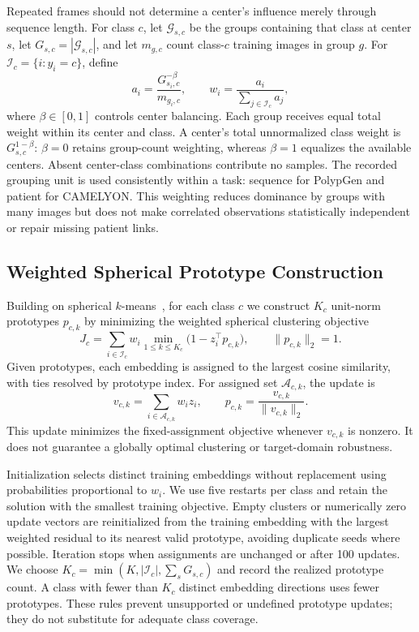 Repeated frames should not determine a center's influence merely through sequence length. For class $c$, let $\mathcal{G}_{s,c}$ be the groups containing that class at center $s$, let $G_{s,c}=|\mathcal{G}_{s,c}|$, and let $m_{g,c}$ count class-$c$ training images in group $g$. For $\mathcal{I}_c=\{i:y_i=c\}$, define
\begin{equation}
    a_i=\frac{G_{s_i,c}^{-\beta}}{m_{g_i,c}},
    \qquad
    w_i=\frac{a_i}{\sum_{j\in\mathcal{I}_c}a_j},
    \label{eq:cbmp_weights}
\end{equation}
where $\beta\in[0,1]$ controls center balancing. Each group receives equal total weight within its center and class. A center's total unnormalized class weight is $G_{s,c}^{1-\beta}$: $\beta=0$ retains group-count weighting, whereas $\beta=1$ equalizes the available centers. Absent center-class combinations contribute no samples. The recorded grouping unit is used consistently within a task: sequence for PolypGen and patient for CAMELYON. This weighting reduces dominance by groups with many images but does not make correlated observations statistically independent or repair missing patient links.

\subsection{Weighted Spherical Prototype Construction}
Building on spherical $k$-means~\cite{dhillon2001spherical}, for each class $c$ we construct $K_c$ unit-norm prototypes $p_{c,k}$ by minimizing the weighted spherical clustering objective
\begin{equation}
    J_c=\sum_{i\in\mathcal{I}_c}w_i
    \min_{1\leq k\leq K_c}\bigl(1-z_i^\top p_{c,k}\bigr),
    \qquad \|p_{c,k}\|_2=1.
    \label{eq:cbmp_clustering}
\end{equation}
Given prototypes, each embedding is assigned to the largest cosine similarity, with ties resolved by prototype index. For assigned set $\mathcal{A}_{c,k}$, the update is
\begin{equation}
    v_{c,k}=\sum_{i\in\mathcal{A}_{c,k}}w_i z_i,
    \qquad p_{c,k}=\frac{v_{c,k}}{\|v_{c,k}\|_2}.
    \label{eq:cbmp_update}
\end{equation}
This update minimizes the fixed-assignment objective whenever $v_{c,k}$ is nonzero. It does not guarantee a globally optimal clustering or target-domain robustness.

Initialization selects distinct training embeddings without replacement using probabilities proportional to $w_i$. We use five restarts per class and retain the solution with the smallest training objective. Empty clusters or numerically zero update vectors are reinitialized from the training embedding with the largest weighted residual to its nearest valid prototype, avoiding duplicate seeds where possible. Iteration stops when assignments are unchanged or after 100 updates. We choose $K_c=\min(K,|\mathcal{I}_c|,\sum_s G_{s,c})$ and record the realized prototype count. A class with fewer than $K_c$ distinct embedding directions uses fewer prototypes. These rules prevent unsupported or undefined prototype updates; they do not substitute for adequate class coverage.

